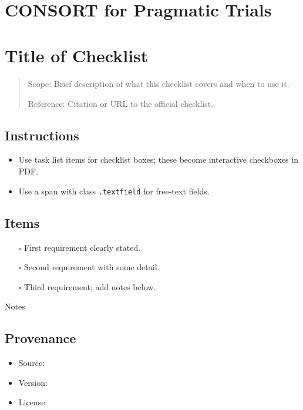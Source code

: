 \documentclass[11pt]{article}
\def\tightlist{}
\begin{document}
\begin{center}
{\LARGE }\\[4pt]
\normalsize 
\end{center}
\vspace{1em}

\begin{Form}

\section{CONSORT for Pragmatic
Trials}\label{consort-for-pragmatic-trials}

\section{Title of Checklist}\label{title-of-checklist}

\begin{quote}
Scope: Brief description of what this checklist covers and when to use
it.

Reference: Citation or URL to the official checklist.
\end{quote}

\subsection{Instructions}\label{instructions}

\begin{itemize}
\tightlist
\item
  Use task list items for checklist boxes; these become interactive
  checkboxes in PDF.
\item
  Use a span with class \texttt{.textfield} for free‑text fields.
\end{itemize}

\subsection{Items}\label{items}

\begin{itemize}
\tightlist
\item[$\square$]
  First requirement clearly stated.
\item[$\square$]
  Second requirement with some detail.
\item[$\square$]
  Third requirement; add notes below.
\end{itemize}

{Notes}

\subsection{Provenance}\label{provenance}

\begin{itemize}
\tightlist
\item
  Source:
\item
  Version:
\item
  License:
\end{itemize}

\end{Form}
\end{document}
